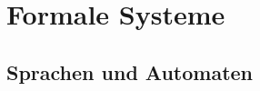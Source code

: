 \documentclass[a4paper,10pt]{article}
\begin{document}


    \section{Formale Systeme}
    \subsection{Sprachen und Automaten}
    \label{subsec:fs-sprachen-automaten}
\end{document}
